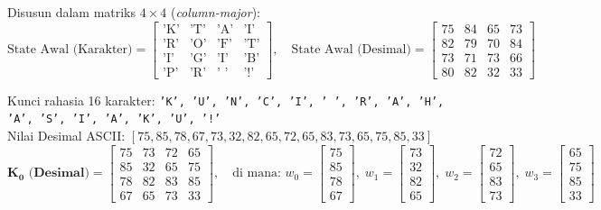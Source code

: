 \documentclass[11pt,a4paper]{article}
\begin{document}
Disusun dalam matriks $4 \times 4$ (\textit{column-major}):
\begin{equation*}
\text{State Awal (Karakter)} = \begin{bmatrix}
\text{'K'} & \text{'T'} & \text{'A'} & \text{'I'} \\
\text{'R'} & \text{'O'} & \text{'F'} & \text{'T'} \\
\text{'I'} & \text{'G'} & \text{'I'} & \text{'B'} \\
\text{'P'} & \text{'R'} & \text{' '} & \text{'!'}
\end{bmatrix}, \quad
\text{State Awal (Desimal)} = \begin{bmatrix}
75 & 84 & 65 & 73 \\
82 & 79 & 70 & 84 \\
73 & 71 & 73 & 66 \\
80 & 82 & 32 & 33
\end{bmatrix}
\end{equation*}

Kunci rahasia 16 karakter: \texttt{'K', 'U', 'N', 'C', 'I', ' ', 'R', 'A', 'H', 'A', 'S', 'I', 'A', 'K', 'U', '!'} \\
Nilai Desimal ASCII: $[75, 85, 78, 67, 73, 32, 82, 65, 72, 65, 83, 73, 65, 75, 85, 33]$
\begin{equation*}
\mathbf{K_0\text{ (Desimal)}} = \begin{bmatrix}
75 & 73 & 72 & 65 \\
85 & 32 & 65 & 75 \\
78 & 82 & 83 & 85 \\
67 & 65 & 73 & 33
\end{bmatrix}, \quad
\text{di mana: }
w_0 = \begin{bmatrix} 75 \\ 85 \\ 78 \\ 67 \end{bmatrix}, \;
w_1 = \begin{bmatrix} 73 \\ 32 \\ 82 \\ 65 \end{bmatrix}, \;
w_2 = \begin{bmatrix} 72 \\ 65 \\ 83 \\ 73 \end{bmatrix}, \;
w_3 = \begin{bmatrix} 65 \\ 75 \\ 85 \\ 33 \end{bmatrix}
\end{equation*}
\end{document}
